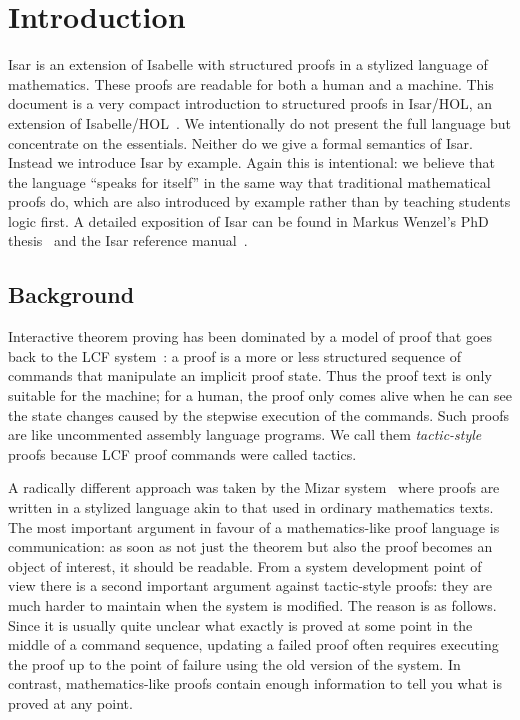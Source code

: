 \section{Introduction}

Isar is an extension of Isabelle with structured proofs in a stylized
language of mathematics. These proofs are readable for both a human
and a machine.  This document is a very compact introduction to
structured proofs in Isar/HOL, an extension of
Isabelle/HOL~\cite{LNCS2283}. We intentionally do not present the full
language but concentrate on the essentials. Neither do we give a
formal semantics of Isar. Instead we introduce Isar by example. Again
this is intentional: we believe that the language ``speaks for
itself'' in the same way that traditional mathematical proofs do, which
are also introduced by example rather than by teaching students logic
first. A detailed exposition of Isar can be found in Markus Wenzel's
PhD thesis~\cite{Wenzel-PhD} and the Isar reference
manual~\cite{Isar-Ref-Man}.

\subsection{Background}

Interactive theorem proving has been dominated by a model of proof
that goes back to the LCF system~\cite{LCF}: a proof is a more or less
structured sequence of commands that manipulate an implicit proof
state. Thus the proof text is only suitable for the machine; for a
human, the proof only comes alive when he can see the state changes
caused by the stepwise execution of the commands. Such proofs are like
uncommented assembly language programs. We call them
\emph{tactic-style} proofs because LCF proof commands were called
tactics.

A radically different approach was taken by the Mizar
system~\cite{Rudnicki92} where proofs are written in a stylized language akin
to that used in ordinary mathematics texts. The most important argument in
favour of a mathematics-like proof language is communication: as soon as not
just the theorem but also the proof becomes an object of interest, it should
be readable.  From a system development point of view there is a second
important argument against tactic-style proofs: they are much harder to
maintain when the system is modified. The reason is as follows. Since it is
usually quite unclear what exactly is proved at some point in the middle of a
command sequence, updating a failed proof often requires executing the proof
up to the point of failure using the old version of the system.  In contrast,
mathematics-like proofs contain enough information to tell you what is proved
at any point.

